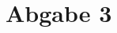 \documentclass[12pt,a4paper,bibliography=totocnumbered]{scrartcl}
\begin{document}

\pagestyle{fancy}
\renewcommand{\sectionmark}[1]{\markright{\arabic{section}.\ #1}}
\renewcommand{\leftmark}{}
\fancyhf{}
\lhead{}
\chead{}
\rhead{\thesection\space\contentsname}
\cfoot{}
\rfoot{\ \linebreak  \thepage}
\renewcommand{\headrulewidth}{0.4pt}
\renewcommand{\footrulewidth}{0.4pt}




\clearpage

\setcounter{page}{1}

\fancyhead[LE,RO]{\rightmark}
\fancyfoot[LE,RO]{\thepage}


\section*{Abgabe 3}
\end{document}
